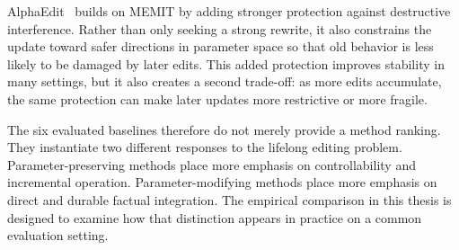 AlphaEdit~\cite{fang2024alphaedit} builds on MEMIT by adding stronger protection against destructive interference. Rather than only seeking a strong rewrite, it also constrains the update toward safer directions in parameter space so that old behavior is less likely to be damaged by later edits. This added protection improves stability in many settings, but it also creates a second trade-off: as more edits accumulate, the same protection can make later updates more restrictive or more fragile.

The six evaluated baselines therefore do not merely provide a method ranking. They instantiate two different responses to the lifelong editing problem. Parameter-preserving methods place more emphasis on controllability and incremental operation. Parameter-modifying methods place more emphasis on direct and durable factual integration. The empirical comparison in this thesis is designed to examine how that distinction appears in practice on a common evaluation setting.
